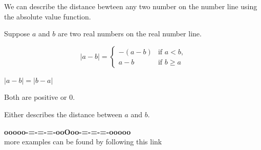 \documentclass{ximera}
\begin{document}
We can describe the distance bewteen any two number on the number line using the absolute value function.

Suppose $a$ and $b$ are two real numbers on the real number line.





\[
|a-b| = 
\begin{cases}
  -(a-b) & \text{if $a<b$,}  \\
  a-b & \text{if $b\ge a$}
\end{cases}
\]



$|a-b| = |b-a|$

Both are positive or $0$.

Either describes the distance between $a$ and $b$.






















\begin{onlineOnly}
\begin{center}
\textbf{\textcolor{green!50!black}{ooooo-=-=-=-ooOoo-=-=-=-ooooo}} \\

more examples can be found by following this link\\ 

\end{center}
\end{onlineOnly}
\end{document}
